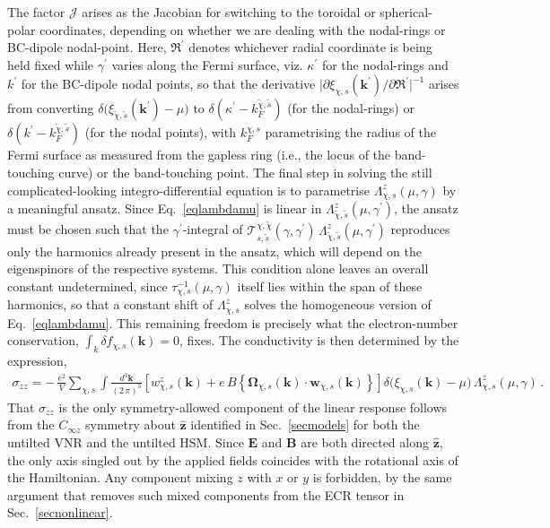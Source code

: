 \documentclass[aps,prb,onecolumn,nofootinbib,citeautoscript,10pt]{revtex4-2}
\newcommand{\bs}[1]{\boldsymbol{#1}}
\begin{document}
The factor $ \mathcal J $ arises as the Jacobian for switching to the toroidal or spherical-polar coordinates, depending on whether we are dealing with the nodal-rings or BC-dipole nodal-point. Here, $\mathfrak{R}^\prime $ denotes whichever radial coordinate is being held fixed while $\gamma^\prime $ varies along the Fermi surface, viz. $\kappa^\prime $ for the nodal-rings and $k^\prime $ for the BC-dipole nodal points, so that the derivative $\big | \partial \xi_{\chi, s}(\boldsymbol k^\prime) / \partial \mathfrak{R}^\prime \big |^{-1} $ arises from converting $ \delta \Big( \xi_{\tilde \chi , \tilde s } (\boldsymbol k^\prime) -\mu \Big) $ to
$\delta (\kappa^\prime - k_F^{ \tilde \chi, \tilde s})$ (for the nodal-rings) or $\delta (k^\prime - k_F^{ \tilde \chi, \tilde s})$ (for the nodal points), with $k_F^{  \chi, s}$ parametrising the radius of the Fermi surface as measured from the gapless ring (i.e., the locus of the band-touching curve) or the band-touching point. The final step in solving the still complicated-looking integro-differential equation is to parametrise ${\Lambda}^z_{\chi, s} (\mu,\gamma )$ by a meaningful ansatz. Since Eq.~\eqref{eqlambdamu} is linear in $ {\Lambda}^z_{\tilde \chi, \tilde s} (\mu,\gamma^\prime )$, the ansatz must be chosen such that the $\gamma^\prime$-integral of $ {\mathcal T }^{\chi, \tilde \chi}_{ s, \tilde s} (\gamma, \gamma^\prime) \, {\Lambda}^z_{\tilde \chi, \tilde s} (\mu,\gamma^\prime )$ reproduces only the harmonics already present in the ansatz, which will depend on the eigenspinors of the respective systems. This condition alone leaves an overall constant undetermined, since $\tau^{-1}_{\chi,s} (\mu,\gamma)$ itself lies within the span of these harmonics, so that a constant shift of $ {\Lambda}^z_{\chi, s} $ solves the homogeneous version of Eq.~\eqref{eqlambdamu}. This remaining freedom is precisely what the electron-number conservation, $\int_k \delta f_{\chi, s} (\boldsymbol k)=0$, fixes.
The conductivity is then determined by the expression,
\begin{align}
\label{eqsigmazzexact}
\sigma_{zz} =  -\,\frac{e^2 } { V } 
\sum_{\chi,s}
\int \frac{d^3 {\boldsymbol k}} {(2\, \pi)^3} 
	\left[   w^z_{\chi, s} (\boldsymbol k)
+ e \, B  \left \lbrace \boldsymbol \Omega_{\chi, s} (\boldsymbol k)
\cdot  \boldsymbol{w}_{\chi, s} (\boldsymbol k) \right  \rbrace   \right] 
\delta \big (\xi_{\chi, s} (\boldsymbol k)-\mu \big) \, {\Lambda}^z_{\chi, s} (\mu, \gamma )	\,. 
\end{align} 
That $\sigma_{zz}$ is the only symmetry-allowed component of the linear
response follows from the $C_{\infty z}$ symmetry about $\hat{\bs z}$
identified in Sec.~\ref{secmodels} for both the untilted VNR and the
untilted HSM. Since $\bs E$ and $\bs B$ are both directed along
$\hat{\bs z}$, the only axis singled out by the applied fields coincides
with the rotational axis of the Hamiltonian. Any component mixing $z$
with $x$ or $y$ is forbidden, by the same argument that removes such
mixed components from the ECR tensor in Sec.~\ref{secnonlinear}.
\end{document}
